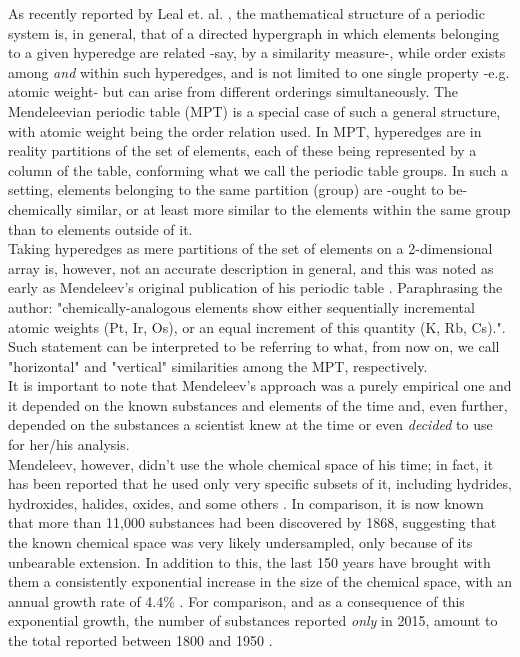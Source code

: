 \documentclass[article]{article}
\begin{document}
As recently reported by Leal et. al. \cite{formalStructPS}, the mathematical structure of a periodic system is, in general, that of a directed hypergraph in which elements belonging to a given hyperedge are related -say, by a similarity measure-, while order exists among \textit{and} within such hyperedges, and is not limited to one single property -e.g. atomic weight- but can arise from different orderings simultaneously. The Mendeleevian periodic table (MPT) is a special case of such a general structure, with atomic weight being the order relation used. In MPT, hyperedges are in reality partitions of the set of elements, each of these being represented by a column of the table, conforming what we call the periodic table groups. In such a setting, elements belonging to the same partition (group) are -ought to be- chemically similar, or at least more similar to the elements within the same group than to elements outside of it. \\

Taking hyperedges as mere partitions of the set of elements on a 2-dimensional array is, however, not an accurate description in general, and this was noted as early as Mendeleev's original publication of his periodic table \cite{originalMendeleev}. Paraphrasing the author: "chemically-analogous elements show either sequentially incremental atomic weights (Pt, Ir, Os), or an equal increment of this quantity (K, Rb, Cs).". Such statement can be interpreted to be referring to what, from now on, we call "horizontal" and "vertical" similarities among the MPT, respectively. \\

It is important to note that Mendeleev's approach was a purely empirical one and it depended on the known substances and elements of the time and, even further, depended on the substances a scientist knew at the time or even \textit{decided} to use for her/his analysis. \\

Mendeleev, however, didn't use the whole chemical space of his time; in fact, it has been reported that he used only very specific subsets of it, including hydrides, hydroxides, halides, oxides, and some others \cite{mendeleevSelectWritings}. In comparison, it is now known that more than 11,000 substances had been discovered by 1868, suggesting that the known chemical space was very likely undersampled, only because of its unbearable extension. In addition to this, the last 150 years have brought with them a consistently exponential increase in the size of the chemical space, with an annual growth rate of 4.4\% \cite{exponentGrowth}. For comparison, and as a consequence of this exponential growth, the number of substances reported \textit{only} in 2015, amount to the total reported between 1800 and 1950 \cite{Restrepo_2019}.\\
\end{document}
